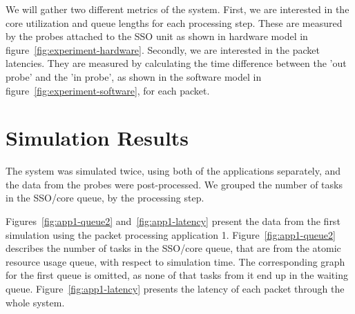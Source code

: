 

We will gather two different metrics of the system. First, we are interested in the core utilization and queue lengths for each processing step. These are measured by the probes attached to the SSO unit as shown in hardware model in figure~\ref{fig:experiment-hardware}. Secondly, we are interested in the packet latencies. They are measured by calculating the time difference between the 'out probe' and the 'in probe', as shown in the software model in figure~\ref{fig:experiment-software}, for each packet.

\section{Simulation Results}
\label{sec:simulation-results}

The system was simulated twice, using both of the applications separately, and the data from the probes were post-processed. We grouped the number of tasks in the SSO/core queue, by the processing step.

Figures~\ref{fig:app1-queue2} and~\ref{fig:app1-latency} present the data from the first simulation using the packet processing application 1. Figure~\ref{fig:app1-queue2} describes the number of tasks in the SSO/core queue, that are from the atomic resource usage queue, with respect to simulation time. The corresponding graph for the first queue is omitted, as none of that tasks from it end up in the waiting queue. Figure~\ref{fig:app1-latency} presents the latency of each packet through the whole system.

